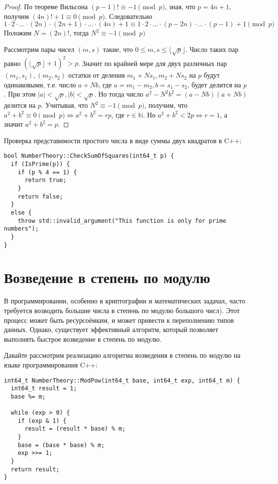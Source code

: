 \documentclass[12pt, a4paper, openany]{book}
\begin{document}
\begin{proof}
    По теореме Вильсона $(p - 1)! \equiv -1 \pmod{p}$, зная, что $p = 4n + 1$, получим $(4n)! + 1 \equiv 0 \pmod{p}$. Следовательно $1 \cdot 2 \cdot \ldots \cdot (2n) \cdot (2n + 1) \cdot \ldots \cdot (4n) + 1 \equiv 1 \cdot 2 \cdot \ldots \cdot (p - 2n) \cdot \ldots \cdot (p - 1) + 1 \pmod{p}$ Положим $N = (2n)!$, тогда $N^2 \equiv -1 \pmod{p}$

    Рассмотрим пары чисел $(m,s)$ такие, что $0 \leq m,s \leq \lfloor \sqrt{p} \rfloor$. Число таких пар равно $(\lfloor \sqrt{p} \rfloor + 1)^2 > p$. Значит по крайней мере для двух различных пар $(m_1, s_1), (m_2, s_2)$ остатки от деления $m_1 + Ns_1, m_2 + Ns_2$ на $p$ будут одинаковыми, т.е. число $a + Nb$, где $a = m_1 - m_2, b = s_1 - s_2$, будет делится на $p$. При этом $\lvert a \rvert < \sqrt{p}, \lvert b \rvert < \sqrt{p}$. Но тогда число $a^2 - N^2b^2 = (a - Nb)(a + Nb)$ делится на $p$. Учитывая, что $N^2 \equiv -1 \pmod{p}$, получим, что $a^2 + b^ 2 \equiv 0 \pmod{p} \Leftrightarrow a^2 + b^2 = rp$, где $r \in \mathbb{N}$. Но $a^2 + b^2 < 2p \Leftrightarrow r = 1$, а значит $a^2 + b^2 = p$. 
\end{proof}

\newpage
\noindent
    Проверка представимости простого числа в виде суммы двух квадратов в C++:
    
\begin{lstlisting}[breaklines=true]
  bool NumberTheory::CheckSumOfSquares(int64_t p) {
  if (IsPrime(p)) {
    if (p % 4 == 1) {
      return true;
    }
    return false;
  }
  else {
    throw std::invalid_argument("This function is only for prime numbers");
  }
}
\end{lstlisting}

\section{Возведение в степень по модулю}

    В программировании, особенно в криптографии и математических задачах, часто требуется возводить большие числа в степень по модулю большого числ). Этот процесс может быть ресурсоёмким, и может привести к переполнению типов данных. Однако, существует эффективный алгоритм, который позволяет выполнять быстрое возведение в степень по модулю.

    Давайте рассмотрим реализацию алгоритма возведения в степень по модулю на языке программирования C++:

\begin{lstlisting}[breaklines=true]
  int64_t NumberTheory::ModPow(int64_t base, int64_t exp, int64_t m) {
  int64_t result = 1;
  base %= m;
  
  while (exp > 0) {
    if (exp & 1) {
      result = (result * base) % m;
    }
    base = (base * base) % m;
    exp >>= 1;
  }
  return result;
}
\end{lstlisting}
\end{document}
